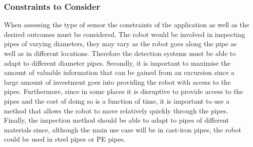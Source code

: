 \documentclass[11pt]{article}		%
\begin{document}
	        \subsubsection{Constraints to Consider}
	        
	        When assessing the type of sensor the constraints of the application as well as the desired outcomes must be considered. 
	        The robot would be involved in inspecting pipes of varying diameters, they may vary as the robot goes along the pipe as well as in different locations. 
	        Therefore the detection systems must be able to adapt to different diameter pipes. 
	        Secondly, it is important to maximise the amount of valuable information that can be gained from an excursion since a large amount of investment goes into providing the robot with access to the pipes.
	        Furthermore, since in some places it is disruptive to provide access to the pipes and the cost of doing so is a function of time, it is important to use a method that allows the robot to move relatively quickly through the pipes. 
	        Finally, the inspection method should be able to adapt to pipes of different materials since, although the main use case will be in cast-iron pipes, the robot could be used in steel pipes or PE pipes.
	
\end{document}
